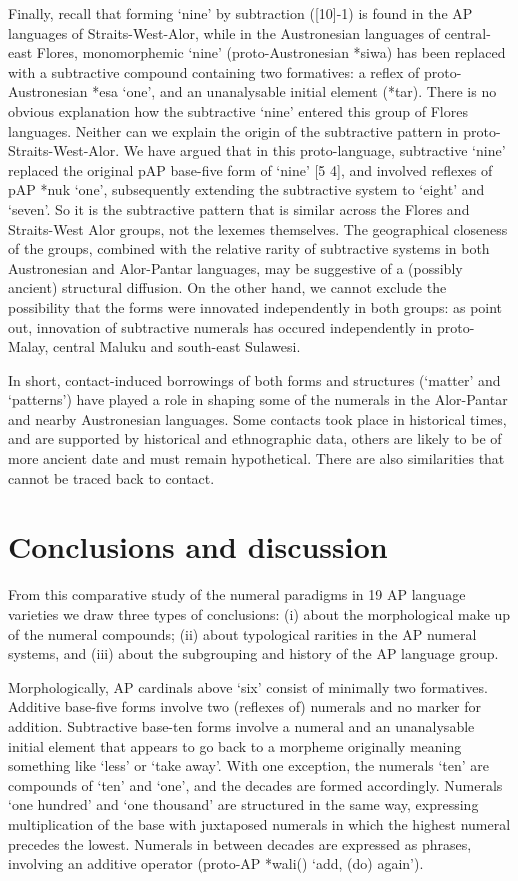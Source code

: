 \documentclass[output=paper]{LSP/langsci}
\begin{document}
Finally, recall that forming `nine' by subtraction ([10]-1) is found in the AP languages of Straits-West-Alor, while in the Austronesian languages of central-east Flores, monomorphemic `nine' (proto-Austronesian *siwa) has been replaced with a subtractive compound containing two formatives: a reflex of proto-Austronesian *esa `one', and an unanalysable initial element (*tar). There is no obvious explanation how the subtractive `nine' entered this group of Flores languages. Neither can we explain the origin of the subtractive pattern in proto-Straits-West-Alor. We have argued that in this proto-language, subtractive `nine' replaced the original pAP base-five form of `nine' [5 4], and involved reflexes of pAP *nuk `one', subsequently extending the subtractive system to `eight' and `seven'. So it is the subtractive pattern that is similar across the Flores and Straits-West Alor groups, not the lexemes themselves. The geographical closeness of the groups, combined with the relative rarity of subtractive systems in both Austronesian and Alor-Pantar languages, may be suggestive of a (possibly ancient) structural diffusion. On the other hand, we cannot exclude the possibility that the forms were innovated independently in both groups: as \citet{SchapperEtAl2013} point out, innovation of subtractive numerals has occured independently in proto-Malay, central Maluku and south-east Sulawesi. 

In short, contact-induced borrowings of both forms and structures (`matter' and `patterns') have played a role in shaping some of the numerals in the Alor-Pantar and nearby Austronesian languages. Some contacts took place in historical times, and are supported by historical and ethnographic data, others are likely to be of more ancient date and must remain hypothetical. There are also similarities that cannot be traced back to contact. 

\section{Conclusions and discussion}\label{sec:6:8}
From this comparative study of the numeral paradigms in 19 AP language varieties we draw three types of conclusions: (i) about the morphological make up of the numeral compounds; (ii) about typological rarities in the AP numeral systems, and (iii) about the subgrouping and history of the AP language group.

Morphologically, AP cardinals above `six' consist of minimally two formatives. Additive base-five forms involve two (reflexes of) numerals and no marker for addition. Subtractive base-ten forms involve a numeral and an unanalysable initial element that appears to go back to a morpheme originally meaning something like `less' or `take away'. With one exception, the numerals `ten' are compounds of `ten' and `one', and the decades are formed accordingly. Numerals `one hundred' and `one thousand' are structured in the same way, expressing multiplication of the base with juxtaposed numerals in which the highest numeral precedes the lowest. Numerals in between decades are expressed as phrases, involving an additive operator (proto-AP *wali({\ng}) `add, (do) again'). 
\end{document}
